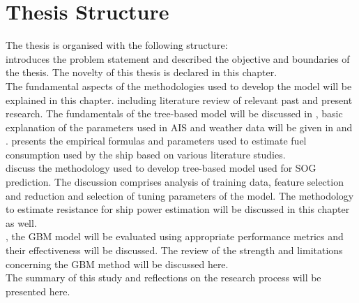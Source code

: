 \section{Thesis Structure}\label{sec:structure_thesis}

The thesis is organised with the following structure:\\

\textbf{} introduces the problem statement and described the objective and boundaries of the thesis. The novelty of this thesis is declared in this chapter.\\

\textbf{} The fundamental aspects of the methodologies used to develop the model will be explained in this chapter. including literature review of relevant past and present research. The fundamentals of the tree-based model will be discussed in , basic explanation of the parameters used in AIS and weather data will be given in  and .  presents the empirical formulas and parameters used to estimate fuel consumption used by the ship based on various literature studies.\\ 

\textbf{} discuss the methodology used to develop tree-based model used for SOG prediction. The discussion comprises analysis of training data, feature selection and reduction and selection of tuning parameters of the model. The methodology to estimate resistance for ship power estimation will be discussed in this chapter as well.\\ 

\textbf{}, the GBM model will be evaluated using appropriate performance metrics and their effectiveness will be discussed. The review of the strength and limitations concerning the GBM method will be discussed here.\\

\textbf{} The summary of this study and reflections on the research process will be presented here. 




 






